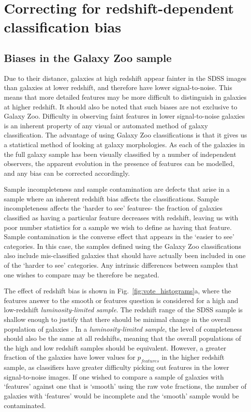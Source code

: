 \documentclass[useAMS,usenatbib]{mn2e}
\begin{document}
\section{Correcting for redshift-dependent classification bias}
\label{sec:redshift_bias}
\subsection{Biases in the Galaxy Zoo sample}
\label{sec:biases}

Due to their distance, galaxies at high redshift appear fainter in the SDSS images than galaxies at lower redshift, and therefore have lower signal-to-noise. This means that more detailed features may be more difficult to distinguish in galaxies at higher redshift. It should also be noted that such biases are not exclusive to Galaxy Zoo. Difficulty in observing faint features in lower signal-to-noise galaxies is an inherent property of any visual or automated method of galaxy classification. The advantage of using Galaxy Zoo classifications is that it gives us a statistical method of looking at galaxy morphologies. As each of the galaxies in the full galaxy sample has been visually classified by a number of independent observers, the apparent evolution in the presence of features can be modelled, and any bias can be corrected accordingly.

Sample incompleteness and sample contamination are defects that arise in a sample where an inherent redshift bias affects the classifications.  Sample incompleteness affects the `harder to see' features- the fraction of galaxies classified as having a particular feature decreases with redshift, leaving us with poor number statistics for a sample we wish to define as having that feature.  Sample contamination is the converse effect that appears in the `easier to see' categories.  In this case, the samples defined using the Galaxy Zoo classifications also include mis-classified galaxies that should have actually been included in one of the `harder to see' categories. Any intrinsic differences between samples that one wishes to compare may be therefore be negated.

The effect of redshift bias is shown in Fig.~\ref{fig:vote_histograms}a, where the features answer to the smooth or features question is considered for a  high and low-redshift \textit{luminosity-limited sample}. The redshift range of the SDSS sample is shallow enough to justify that there should be minimal change in the overall population of galaxies \citep{Bamford_09,Willett_13}. In a \textit{luminosity-limited sample}, the level of completeness should also be the same at all redshifts, meaning that the overall populations of the high and low redshift samples should be equivalent. However, a greater fraction of the galaxies have lower values for $p_{features}$ in the higher redshift sample, as classifiers have greater difficulty picking out features in the lower signal-to-noise images. If one wished to compare a sample of galaxies with `features' against one that is `smooth' using the raw vote fractions, the number of galaxies with `features' would be incomplete and the `smooth' sample would be contaminated.
\end{document}
